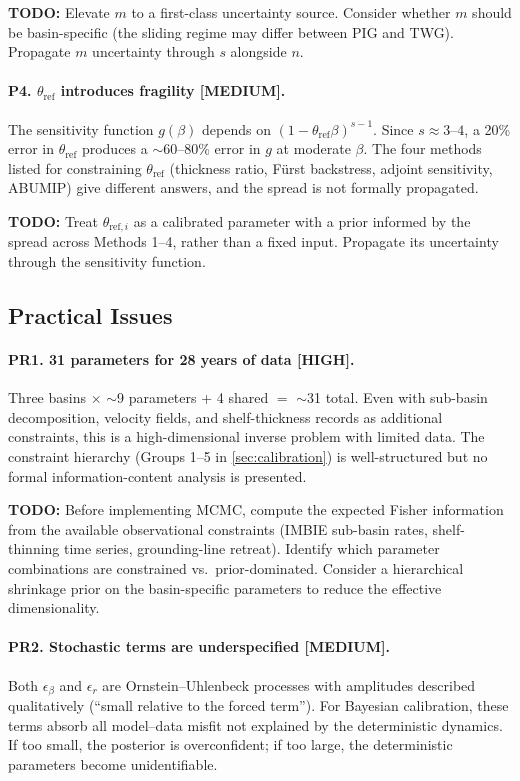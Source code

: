 \documentclass[11pt]{article}
\theoremstyle{definition}
\begin{document}
\textbf{TODO:} Elevate $m$ to a first-class uncertainty source.  Consider whether $m$ should be basin-specific (the sliding regime may differ between PIG and TWG).  Propagate $m$ uncertainty through $s$ alongside $n$.

\paragraph{P4. $\theta_{\text{ref}}$ introduces fragility [MEDIUM].}
The sensitivity function $g(\beta)$ depends on $(1 - \theta_{\text{ref}} \beta)^{s-1}$.  Since $s \approx 3$--$4$, a 20\% error in $\theta_{\text{ref}}$ produces a $\sim$60--80\% error in $g$ at moderate $\beta$.  The four methods listed for constraining $\theta_{\text{ref}}$ (thickness ratio, F\"urst backstress, adjoint sensitivity, ABUMIP) give different answers, and the spread is not formally propagated.

\textbf{TODO:} Treat $\theta_{\text{ref},i}$ as a calibrated parameter with a prior informed by the spread across Methods 1--4, rather than a fixed input.  Propagate its uncertainty through the sensitivity function.

\subsection{Practical Issues}

\paragraph{PR1. 31 parameters for 28 years of data [HIGH].}
Three basins $\times$ $\sim$9 parameters + 4 shared $=$ $\sim$31 total.  Even with sub-basin decomposition, velocity fields, and shelf-thickness records as additional constraints, this is a high-dimensional inverse problem with limited data.  The constraint hierarchy (Groups 1--5 in \cref{sec:calibration}) is well-structured but no formal information-content analysis is presented.

\textbf{TODO:} Before implementing MCMC, compute the expected Fisher information from the available observational constraints (IMBIE sub-basin rates, shelf-thinning time series, grounding-line retreat).  Identify which parameter combinations are constrained vs.\ prior-dominated.  Consider a hierarchical shrinkage prior on the basin-specific parameters to reduce the effective dimensionality.

\paragraph{PR2. Stochastic terms are underspecified [MEDIUM].}
Both $\epsilon_\beta$ and $\epsilon_r$ are Ornstein--Uhlenbeck processes with amplitudes described qualitatively (``small relative to the forced term'').  For Bayesian calibration, these terms absorb all model--data misfit not explained by the deterministic dynamics.  If too small, the posterior is overconfident; if too large, the deterministic parameters become unidentifiable.
\end{document}
